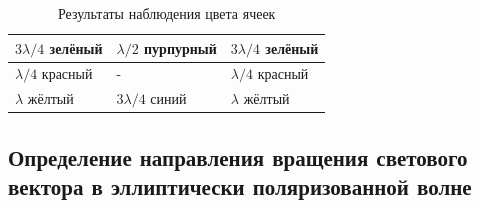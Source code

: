 \documentclass[15pt,a5paper,reqno]{article}
\begin{document}
    \begin{table}[h]
    \centering
    \begin{center}
    \caption{Результаты наблюдения цвета ячеек}
    \end{center}
    \vspace{0.1cm}
    \label{tab:my_label}
    \begin{tabular}{ |p{2.5cm}|p{2.5cm}|p{2.5cm}|}
 \hline
 $3\lambda/4$ зелёный & $\lambda/2$ пурпурный & $3\lambda/4$ зелёный\\
\hline
 $\lambda/4$ красный & - & $\lambda/4$ красный \\
\hline
 $\lambda$ жёлтый & $3\lambda/4$ синий & $\lambda$ жёлтый \\
\hline
 
\end{tabular}
\end{table}

\subsection{Определение направления вращения светового вектора в
эллиптически поляризованной волне}
\end{document}
